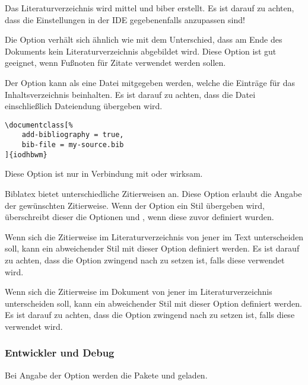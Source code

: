 \documentclass[babel=ngerman,highlight=false]{skdoc}
\begin{document}
                Das Literaturverzeichnis wird mittel  und biber erstellt. Es ist darauf zu achten, dass die Einstellungen in der IDE gegebenenfalls anzupassen sind!\medskip

                Die Option verhält sich ähnlich wie  mit dem Unterschied, dass am Ende des Dokuments kein Literaturverzeichnis abgebildet wird. Diese Option ist gut geeignet, wenn Fußnoten für Zitate verwendet werden sollen.\medskip

                Der Option kann als  eine Datei mitgegeben werden, welche die Einträge für das Inhaltsverzeichnis beinhalten. Es ist darauf zu achten, dass die Datei einschließlich Dateiendung übergeben wird.
                \begin{verbatim}
\documentclass[%
    add-bibliography = true,
    bib-file = my-source.bib
]{iodhbwm}
                \end{verbatim}
                Diese Option ist nur in Verbindung mit  oder  wirksam.\medskip

                Biblatex bietet unterschiedliche Zitierweisen an. Diese Option erlaubt die Angabe der gewünschten Zitierweise. Wenn der Option ein Stil übergeben wird, überschreibt dieser die Optionen  und , wenn diese zuvor definiert wurden.\medskip

                Wenn sich die Zitierweise im Literaturverzeichnis von jener im Text unterscheiden soll, kann ein abweichender Stil mit dieser Option definiert werden. Es ist darauf zu achten, dass die Option zwingend nach  zu setzen ist, falls diese verwendet wird.\medskip

                Wenn sich die Zitierweise im Dokument von jener im Literaturverzeichnis unterscheiden soll, kann ein abweichender Stil mit dieser Option definiert werden. Es ist darauf zu achten, dass die Option zwingend nach  zu setzen ist, falls diese verwendet wird.\medskip

            \subsubsection{Entwickler und Debug}
                Bei Angabe der Option werden die Pakete  und  geladen.
\end{document}
